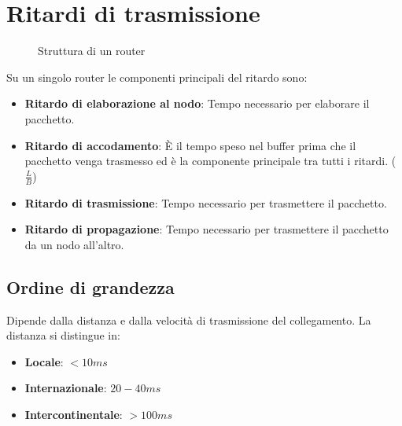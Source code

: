 \documentclass[a4paper]{article}
\begin{document}
\section{Ritardi di trasmissione}
\begin{figure}[H]
  \centering
  \caption{Struttura di un router}
\end{figure}

Su un singolo router le componenti principali del ritardo sono:
\begin{itemize}
  \item \textbf{Ritardo di elaborazione al nodo}: Tempo necessario per elaborare
    il pacchetto.
  \item \textbf{Ritardo di accodamento}: È il tempo speso nel buffer prima che
    il pacchetto venga trasmesso ed è la componente principale tra tutti i
    ritardi. (\( \frac{L}{B} \))
  \item \textbf{Ritardo di trasmissione}: Tempo necessario per trasmettere il
    pacchetto.
  \item \textbf{Ritardo di propagazione}: Tempo necessario per trasmettere il
    pacchetto da un nodo all'altro.
\end{itemize}

\subsection{Ordine di grandezza}
Dipende dalla distanza e dalla velocità di trasmissione del collegamento. La
distanza si distingue in:
\begin{itemize}
  \item \textbf{Locale}: \( < 10ms \) 
  \item \textbf{Internazionale}: \( 20-40ms \) 
  \item \textbf{Intercontinentale}: \( > 100ms \)
\end{itemize}
\end{document}
